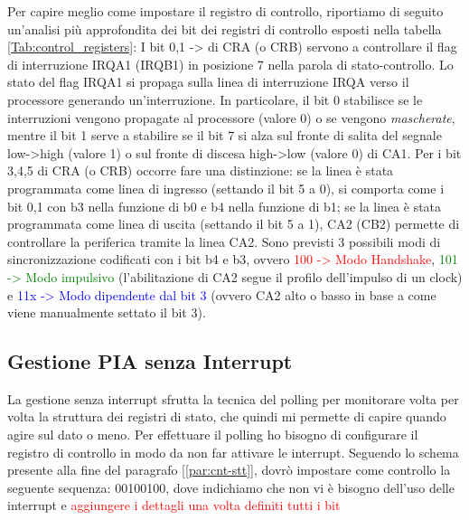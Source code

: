 
Per capire meglio come impostare il registro di controllo, riportiamo di seguito un'analisi più approfondita dei bit dei registri di controllo esposti nella tabella \ref{Tab:control_registers}:
I bit 0,1 -> di CRA (o CRB) servono a controllare il flag di interruzione IRQA1 (IRQB1) in posizione 7 nella parola di stato-controllo. Lo stato del flag IRQA1 si propaga sulla linea di interruzione IRQA verso il processore generando un'interruzione. In particolare, il bit 0 stabilisce se le interruzioni vengono propagate al processore (valore 0) o se vengono \textit{mascherate}, mentre il bit 1 serve a stabilire se il bit 7 si alza sul fronte di salita del segnale low->high (valore 1) o sul fronte di discesa high->low (valore 0) di CA1.
Per i bit 3,4,5 di CRA (o CRB) occorre fare una distinzione: se la linea è stata programmata come linea di ingresso (settando il bit 5 a 0), si comporta come i bit 0,1 con b3 nella funzione di b0 e b4 nella funzione di b1; se la linea è stata programmata come linea di uscita (settando il bit 5 a 1), CA2 (CB2) permette di controllare la periferica tramite la linea CA2. Sono previsti 3 possibili modi di sincronizzazione codificati con i bit b4 e b3, ovvero \textcolor{red}{100 -> Modo Handshake}, \textcolor{green}{101 -> Modo impulsivo} (l'abilitazione di CA2 segue il profilo dell'impulso di un clock) e \textcolor{blue}{11x -> Modo dipendente dal bit 3} (ovvero CA2 alto o basso in base a come viene manualmente settato il bit 3).  



\subsection{Gestione PIA senza Interrupt}\label{par:PIA-INT}
La gestione senza interrupt sfrutta la tecnica del polling per monitorare volta per volta la struttura dei registri di stato, che quindi mi permette di capire quando agire sul dato o meno. Per effettuare il polling ho bisogno di configurare il registro di controllo in modo da non far attivare le interrupt.
Seguendo lo schema presente alla fine del paragrafo [\ref{par:cnt-stt}], dovrò impostare come controllo la seguente sequenza: 00100100, dove indichiamo che non vi è bisogno dell'uso delle interrupt e \textcolor{red}{aggiungere i dettagli una volta definiti tutti i bit}

